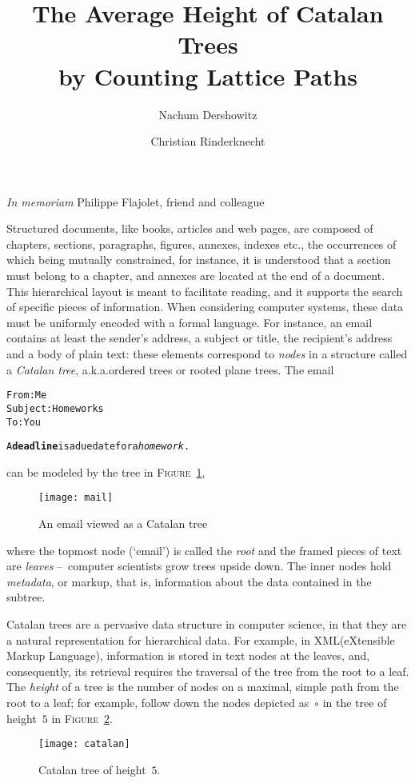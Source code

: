 \documentclass[11pt]{article}
\title{The Average Height of Catalan Trees\\
  by Counting Lattice Paths}
\author{Nachum Dershowitz \and Christian Rinderknecht}
\date{}
\newcommand{\XML}{\textsf{XML}\xspace}
\newcommand\fig{\textsc{Figure}}
\begin{document}
\maketitle

\hfill \emph{In memoriam} Philippe Flajolet, friend and colleague

\bigskip

Structured documents, like books, articles and web pages, are composed
of chapters, sections, paragraphs, figures, annexes, indexes etc., the
occurrences of which being mutually constrained, for instance, it is
understood that a section must belong to a chapter, and annexes are
located at the end of a document. This hierarchical layout is meant to
facilitate reading, and it supports the search of specific pieces of
information. When considering computer systems, these data must be
uniformly encoded with a formal language. For instance, an email
contains at least the sender's address, a subject or title, the
recipient's address and a body of plain text: these elements
correspond to \emph{nodes} in a structure called a \emph{Catalan
  tree}, a.k.a.\@ ordered trees or rooted plane trees. The email
\begin{alltt}
From: Me
Subject: Homeworks
To: You

  A \textbf{deadline} is a due date for a \emph{homework}.
\end{alltt}
can be modeled by the tree in \fig~\ref{fig:mail},
\begin{figure}
\centering
\texttt{[image: mail]}
\caption{An email viewed as a Catalan tree\label{fig:mail}}
\end{figure}
where the topmost node (`email') is called the \emph{root} and the
framed pieces of text are \emph{leaves} --~computer scientists grow
trees upside down. The inner nodes hold \emph{metadata}, or markup,
that is, information about the data contained in the subtree.

Catalan trees are a pervasive data structure in computer science, in
that they are a natural representation for hierarchical data. For
example, in \XML (eXtensible Markup Language), information is stored
in text nodes at the leaves, and, consequently, its retrieval requires
the traversal of the tree from the root to a leaf. The \emph{height}
of a tree is the number of nodes on a maximal, simple path from the
root to a leaf; for example, follow down the nodes depicted
as~\(\circ\) in the tree of height~\(5\) in \fig~\ref{fig:catalan}.
\begin{figure}
\centering
\texttt{[image: catalan]}
\caption{Catalan tree of height~\(5\).\label{fig:catalan}}
\end{figure}
\end{document}
